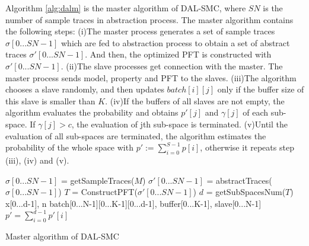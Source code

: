 Algorithm \ref{alg:dalm} is the master algorithm of DAL-SMC, where $SN$ is the number of sample traces in abstraction process. The master algorithm contains the following steps: (i)The master process generates a set of sample traces $\sigma[0...SN-1]$ which are fed to abstraction process to obtain a set of abstract traces $\sigma'[0...SN-1]$. And then, the optimized PFT is constructed with $\sigma'[0...SN-1]$. (ii)The slave processes get connection with the master. The master process sends model, property and PFT to the slaves. (iii)The algorithm chooses a slave randomly, and then updates $batch[i][j]$ only if the buffer size of this slave is smaller than $K$. (iv)If the buffers of all slaves are not empty, the algorithm evaluates the probability and obtains $p'[j]$ and $\gamma[j]$ of each sub-space. If $\gamma[j] > c$, the evaluation of jth sub-space is terminated. (v)Until the evaluation of all sub-spaces are terminated, the algorithm estimates the probability of the whole space with $p' := \sum\limits_{i=0}^{S-1} p[i]$, otherwise it repeats step (iii), (iv) and (v).
\begin{algorithm}[t]
{}
$\sigma[0...SN-1]$ = getSampleTraces($M$)\;
$\sigma'[0...SN-1]$ = abstractTraces($\sigma[0...SN-1]$)\;
$T$ = ConstructPFT($\sigma'[0...SN-1]$)\;
$d$ = getSubSpacesNum($T$)\;
x[0...d-1], n\;
batch[0...N-1][0...K-1][0...d-1], buffer[0...K-1], slave[0...N-1]\;
 $p' = \sum\limits_{i=0}^{d-1} p'[i]$\;
\caption{Master algorithm of DAL-SMC}
\label{alg:dalm}
\end{algorithm}
